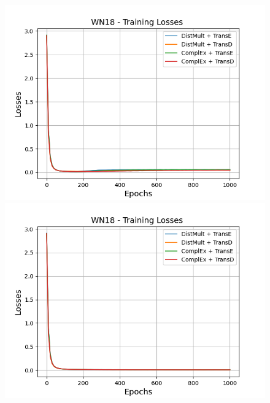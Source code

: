 \begin{figure}[H]
    \centering
    \begin{minipage}{.45\textwidth}
      \centering
      \includegraphics[width=0.9\linewidth]{figures/results/gan_train/not_pretrained/random/wn18/epochs1000/random_wn18_losses.png}
    \end{minipage}%
    \begin{minipage}{.45\textwidth}
      \centering
      \includegraphics[width=0.9\linewidth]{figures/results/gan_train/not_pretrained/uncertainty/max_distribution/entropy/wn18/1k_epochs/uncertainty_wn18_losses.png}
    \end{minipage}
    \begin{minipage}{.45\textwidth}
      \centering

\end{minipage}
\end{figure}
